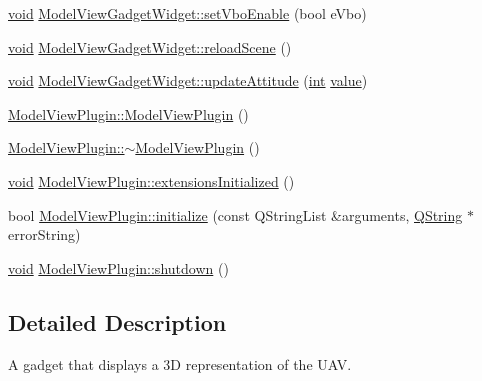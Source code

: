 \begin{DoxyCompactItemize}
\item 
\hyperlink{group___u_a_v_objects_plugin_ga444cf2ff3f0ecbe028adce838d373f5c}{void} \hyperlink{group___model_view_plugin_ga9ae7a41d63686c2ec25ee02e08ffed21}{Model\-View\-Gadget\-Widget\-::set\-Vbo\-Enable} (bool e\-Vbo)
\item 
\hyperlink{group___u_a_v_objects_plugin_ga444cf2ff3f0ecbe028adce838d373f5c}{void} \hyperlink{group___model_view_plugin_gad031b977be54f4bd5243fa4d6f846f68}{Model\-View\-Gadget\-Widget\-::reload\-Scene} ()
\item 
\hyperlink{group___u_a_v_objects_plugin_ga444cf2ff3f0ecbe028adce838d373f5c}{void} \hyperlink{group___model_view_plugin_gaa7c16fd0b59ded87f8d136fd72680dca}{Model\-View\-Gadget\-Widget\-::update\-Attitude} (\hyperlink{ioapi_8h_a787fa3cf048117ba7123753c1e74fcd6}{int} \hyperlink{glext_8h_aa0e2e9cea7f208d28acda0480144beb0}{value})
\item 
\hyperlink{group___model_view_plugin_gafbc74cc8c17048cddb875add75e65cad}{Model\-View\-Plugin\-::\-Model\-View\-Plugin} ()
\item 
\hyperlink{group___model_view_plugin_gac1d370684cf595a557c80ee2d6572e39}{Model\-View\-Plugin\-::$\sim$\-Model\-View\-Plugin} ()
\item 
\hyperlink{group___u_a_v_objects_plugin_ga444cf2ff3f0ecbe028adce838d373f5c}{void} \hyperlink{group___model_view_plugin_gaf0ae0222c081f943759de1e0697df04e}{Model\-View\-Plugin\-::extensions\-Initialized} ()
\item 
bool \hyperlink{group___model_view_plugin_ga6f9214b4e1b72063475d8351046df6bb}{Model\-View\-Plugin\-::initialize} (const Q\-String\-List \&arguments, \hyperlink{group___u_a_v_objects_plugin_gab9d252f49c333c94a72f97ce3105a32d}{Q\-String} $\ast$error\-String)
\item 
\hyperlink{group___u_a_v_objects_plugin_ga444cf2ff3f0ecbe028adce838d373f5c}{void} \hyperlink{group___model_view_plugin_gad3a367fabe72d1e3a0063267d0170df9}{Model\-View\-Plugin\-::shutdown} ()
\end{DoxyCompactItemize}


\subsection{Detailed Description}
A gadget that displays a 3\-D representation of the U\-A\-V. 


